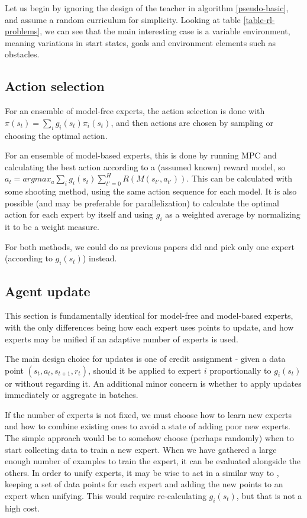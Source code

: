 \documentclass[letterpaper]{article}
\theoremstyle{definition}
\begin{document}
Let us begin by ignoring the design of the teacher in algorithm \ref{pseudo-basic}, and assume a random curriculum for simplicity.
Looking at table \ref{table-rl-problems},  we can see that the main interesting case is a variable environment, meaning variations in start states, goals and environment elements such as obstacles.

\subsection{Action selection}

For an ensemble of model-free experts, the action selection is done with $\pi(s_t) = \sum_{i} g_i(s_t) \pi_i(s_t)$, and then actions are chosen by sampling or choosing the optimal action.

For an ensemble of model-based experts, this is done by running MPC and calculating the best action according to a (assumed known) reward model, so $a_t = argmax_a \sum_{i} g_i(s_t) \sum_{t'=0}^{H} R(M(s_{t'}, a_{t'}))$.
This can be calculated with some shooting method, using the same action sequence for each model.
It is also possible (and may be preferable for parallelization) to calculate the optimal action for each expert by itself and using $g_i$ as a weighted average by normalizing it to be a weight measure.

For both methods, we could do as previous papers did and pick only one expert (according to $g_i(s_t)$) instead.

\subsection{Agent update}

This section is fundamentally identical for model-free and model-based experts, with the only differences being how each expert uses points to update, and how experts may be unified if an adaptive number of experts is used.

The main design choice for updates is one of credit assignment - given a data point $(s_t, a_t, s_{t+1}, r_t)$, should it be applied to expert $i$ proportionally to $g_i(s_t)$ or without regarding it.
An additional minor concern is whether to apply updates immediately or aggregate in batches.

If the number of experts is not fixed, we must choose how to learn new experts and how to combine existing ones to avoid a state of adding poor new experts.
The simple approach would be to somehow choose (perhaps randomly) when to start collecting data to train a new expert. When we have gathered a large enough number of examples to train the expert, it can be evaluated alongside the others. 
In order to unify experts, it may be wise to act in a similar way to \cite{Xu2020a}, keeping a set of data points for each expert and adding the new points to an expert when unifying. This would require re-calculating $g_i(s_t)$, but that is not a high cost. 
\end{document}
